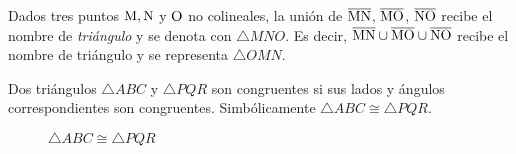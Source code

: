 \begin{definition}
    Dados tres puntos $\rm M,N$ y $\rm O$ no colineales, la unión de $\overline{\rm MN}$, $\overline{\rm MO}$, $\overline{\rm NO}$ recibe el nombre de \textit{triángulo} y se denota con $\triangle{MNO}$. Es decir, $\overline{\rm MN} \cup \overline{\rm MO} \cup \overline{\rm NO}$ recibe el nombre de triángulo y se representa $\triangle{OMN}$.

    \begin{figure}[!h]
        \centering
        
        \label{fig:triangle}
    \end{figure}
    
\end{definition}

\begin{definition}
    Dos triángulos $\triangle{ABC}$ y $\triangle{PQR}$ son congruentes si sus lados y ángulos correspondientes son congruentes. Simbólicamente $\triangle{ABC} \cong \triangle{PQR}$.

    \begin{figure}[h!]

        \centering

        \begin{subfigure}[b]{.5\textwidth}
            \centering
            
            \label{fig:triag-congruence-1}
        \end{subfigure}%
        \begin{subfigure}[b]{.5\textwidth}
            \centering
            
            \label{fig:triag-congruence-2}
        \end{subfigure}

        \centering
        \caption{$\triangle{ABC} \cong \triangle{PQR}$}
        \label{fig:triang-congruence}
        
    \end{figure}    
    
\end{definition}

